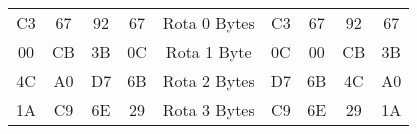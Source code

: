 \begin{tabular}{|c|c|c|c|c|c|c|c|c|}
  \cline{1-4} \cline{6-9}
  C3 & 67 & 92 & 67 & Rota 0 Bytes & C3 & 67 & 92 & 67 \\ \cline{1-4} \cline{6-9} 
  00 & CB & 3B & \cellcolor[HTML]{FFCCC9}0C & Rota 1 Byte & \cellcolor[HTML]{FFCCC9}0C & 00 & CB & 3B \\ \cline{1-4} \cline{6-9} 
  4C & A0 & \cellcolor[HTML]{9AFF99}D7 & \cellcolor[HTML]{9AFF99}6B & Rota 2 Bytes & \cellcolor[HTML]{9AFF99}D7 & \cellcolor[HTML]{9AFF99}6B & 4C & A0 \\ \cline{1-4} \cline{6-9} 
  1A & \cellcolor[HTML]{FFFC9E}C9 & \cellcolor[HTML]{FFFC9E}6E & \cellcolor[HTML]{FFFC9E}29 & Rota 3 Bytes & \cellcolor[HTML]{FFFC9E}C9 & \cellcolor[HTML]{FFFC9E}6E & \cellcolor[HTML]{FFFC9E}29 & 1A \\ \cline{1-4} \cline{6-9} 
\end{tabular}